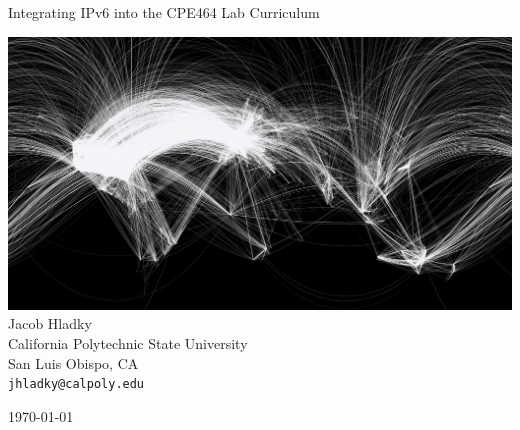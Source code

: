 \documentclass[12pt]{article}
\begin{document}
\begin{titlepage}
  \begin{center}
    \vspace*{1cm}
    \huge{Integrating IPv6 into the CPE464 Lab Curriculum}

    \vspace{1.5cm}

    \includegraphics[width=1\textwidth]{internet_map.png}
    \vfill
    \large{
      Jacob Hladky\\
      California Polytechnic State University\\
      San Luis Obispo, CA\\
      \texttt{jhladky@calpoly.edu}
    }

    \vspace{1cm}

    \today   
  \end{center}
\end{titlepage}


\tableofcontents

\listoffigures
\listoftables

\end{document}
